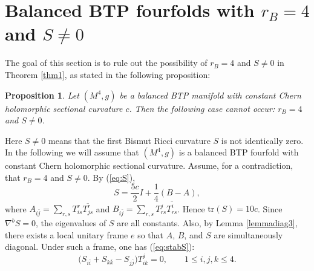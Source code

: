 \documentclass{amsart}
\newtheorem{proposition}{Proposition}
\begin{document}
\section{Balanced BTP fourfolds with \texorpdfstring{$r_B=4$ and $S\neq 0$}{rB = 4 and S != 0}}

The goal of this section is to rule out the possibility of $r_B=4$ and $S\neq 0$ in Theorem \ref{thm1}, as stated in the following proposition:

\begin{proposition} \label{prop4a}
Let $(M^4,g)$ be a balanced BTP manifold with constant Chern holomorphic sectional curvature $c$. Then the following case cannot occur: $r_B=4$ and $S\neq 0$.
\end{proposition}

Here $S\neq 0$ means that the first Bismut Ricci curvature $S$ is not identically zero. In the following we will assume  that $(M^4,g)$ is a balanced BTP fourfold with constant Chern holomorphic sectional curvature.  Assume, for a contradiction, that $r_B=4$ and $S\neq 0$. By (\ref{eq:S}),
$$ S = \frac{5c}{2}I + \frac{1}{4}(B-A), $$
where $A_{i\bar{j}} = \sum_{r,s} T^r_{is} \overline{T^r_{js}} $ and $B_{i\bar{j}} = \sum_{r,s} T^j_{rs} \overline{T^i_{rs}} $. Hence $\mbox{tr}(S)=10c$. Since $\nabla^bS=0$, the eigenvalues of $S$ are all constants. Also, by Lemma \ref{lemmadiag3}, there exists a local unitary frame $e$ so that $A$, $B$, and $S$ are simultaneously diagonal. Under such a frame, one has (\ref{eq:stabS}):
\begin{equation}  \label{eq:stabS2}
 \big(S_{i\bar i}+S_{k\bar k}-S_{j\bar j}\big)T^j_{ik}=0,
\qquad 1\le i,j,k\le4.
\end{equation}



\vspace{0.25cm}
\end{document}
